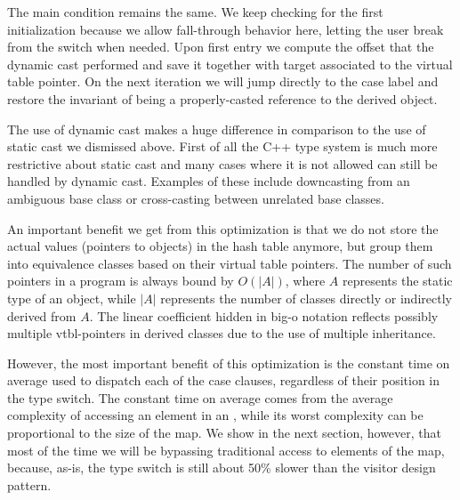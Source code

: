 \noindent
The main condition remains the same. We keep checking for the first initialization 
because we allow fall-through behavior here, letting the user break from the 
switch when needed. Upon first entry we compute the offset that the dynamic cast 
performed and save it together with target associated to the virtual table 
pointer. On the next iteration we will jump directly to the case label and 
restore the invariant of  being a properly-casted reference to the 
derived object.

The use of dynamic cast makes a huge difference in comparison to the use of 
static cast we dismissed above. First of all the C++ type system is much more 
restrictive about static cast and many cases where it is not allowed can 
still be handled by dynamic cast. Examples of these include downcasting from an 
ambiguous base class or cross-casting between unrelated base classes.

An important benefit we get from this optimization is that we do not store the 
actual values (pointers to objects) in the hash table anymore, but group them 
into equivalence classes based on their virtual table pointers. The number of 
such pointers in a program is always bound by $O(|A|)$, where $A$ represents the 
static type of an object, while $|A|$ represents the number of classes directly 
or indirectly derived from $A$. The linear coefficient hidden in big-o notation 
reflects possibly multiple vtbl-pointers in derived classes due to the use of 
multiple inheritance.

However, the most important benefit of this optimization is the constant time on average 
used to dispatch each of the case clauses, regardless of their position in the 
type switch. The constant time on average comes from the average complexity 
of accessing an element in an , while its worst complexity can 
be proportional to the size of the map. We show in the next section, however, 
that most of the time we will be bypassing traditional access to elements of the 
map, because, as-is, the type switch is still about 50\% slower than the visitor 
design pattern.


